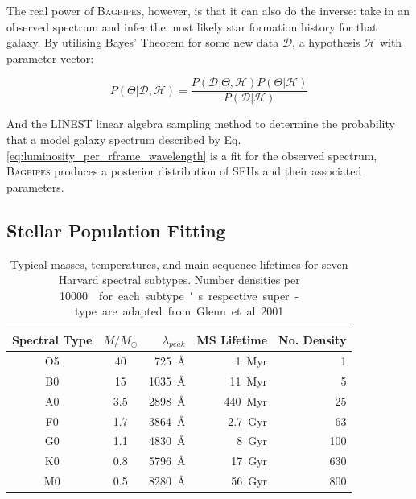 \documentclass[a4paper,11pt]{article}
\begin{document}
The real power of \textsc{Bagpipes}, however, is that it can also do the inverse: take in an observed spectrum and infer the most likely star formation history for that galaxy. By utilising Bayes' Theorem for some new data $\mathcal{D}$, a hypothesis $\mathcal{H}$ with parameter vector:

\begin{equation}\label{eq:bayes_theorem}
  P(\Theta|\mathcal{D},\mathcal{H}) =
  \frac
  {P(\mathcal{D}|\Theta,\mathcal{H})P(\Theta|\mathcal{H})}
  {P(\mathcal{D}|\mathcal{H})}
\end{equation}

And the \textsc{LINEST} linear algebra sampling method to determine the probability that a model galaxy spectrum described by Eq. \ref{eq:luminosity_per_rframe_wavelength} is a fit for the observed spectrum, \textsc{Bagpipes} produces a posterior distribution of SFHs and their associated parameters.

\subsection{Stellar Population Fitting}\label{sec:stellar_population_fitting}

\begin{table}
  \centering
  \begin{tabular}{c c r r r}
    Spectral Type & $M/M_\odot$ & $\lambda_{peak}$     & MS Lifetime   & No. Density \\
    \hline \hline
    O5            &	40          & \SI{725}{\angstrom}  & \SI{1}{Myr}   & 1           \\
    B0            &	15          & \SI{1035}{\angstrom} & \SI{11}{Myr}  & 5           \\
    A0            &	3.5         & \SI{2898}{\angstrom} & \SI{440}{Myr} & 25          \\
    F0            &	1.7         & \SI{3864}{\angstrom} & \SI{2.7}{Gyr} & 63          \\
    G0            &	1.1         & \SI{4830}{\angstrom} & \SI{8}{Gyr}   & 100         \\
    K0            &	0.8         & \SI{5796}{\angstrom} & \SI{17}{Gyr}  & 630         \\
    M0            &	0.5         & \SI{8280}{\angstrom} & \SI{56}{Gyr}  & 800         \\
    \hline
  \end{tabular}
  \caption{Typical masses, temperatures, and main-sequence lifetimes for seven Harvard spectral subtypes. Number densities per \SI{10000}{\cubic\parsec} for each subtype's respective super-type are adapted from Glenn et al. 2001.\cite{Glenn_2001}}
  \label{tab:star_lifetimes_densities}
\end{table}
\end{document}
